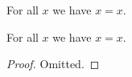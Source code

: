 \begin{axiom}\label{phase5_escape_source_axiom}
    For all $x$ we have $x = x$.
\end{axiom}

\begin{proposition}\label{phase5_escape_omitted_theorem}
    For all $x$ we have $x = x$.
\end{proposition}
\begin{proof}
    Omitted.
\end{proof}

